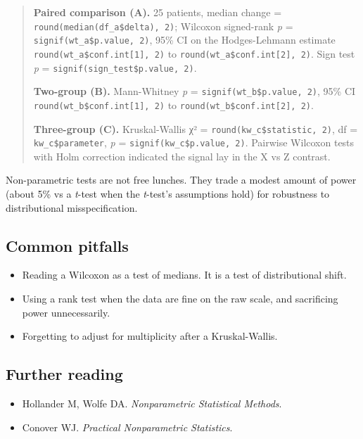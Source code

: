 \documentclass[
]{article}
\providecommand{\tightlist}{%
  \setlength{\itemsep}{0pt}\setlength{\parskip}{0pt}}
\begin{document}
\begin{quote}
\textbf{Paired comparison (A).} 25 patients, median change =
\texttt{round(median(df\_a\$delta),\ 2)}; Wilcoxon signed-rank \emph{p}
= \texttt{signif(wt\_a\$p.value,\ 2)}, 95\% CI on the Hodges-Lehmann
estimate \texttt{round(wt\_a\$conf.int{[}1{]},\ 2)} to
\texttt{round(wt\_a\$conf.int{[}2{]},\ 2)}. Sign test \emph{p} =
\texttt{signif(sign\_test\$p.value,\ 2)}.

\textbf{Two-group (B).} Mann-Whitney \emph{p} =
\texttt{signif(wt\_b\$p.value,\ 2)}, 95\% CI
\texttt{round(wt\_b\$conf.int{[}1{]},\ 2)} to
\texttt{round(wt\_b\$conf.int{[}2{]},\ 2)}.

\textbf{Three-group (C).} Kruskal-Wallis χ² =
\texttt{round(kw\_c\$statistic,\ 2)}, df = \texttt{kw\_c\$parameter},
\emph{p} = \texttt{signif(kw\_c\$p.value,\ 2)}. Pairwise Wilcoxon tests
with Holm correction indicated the signal lay in the X vs Z contrast.
\end{quote}

Non-parametric tests are not free lunches. They trade a modest amount of
power (about 5\% vs a \emph{t}-test when the \emph{t}-test's assumptions
hold) for robustness to distributional misspecification.

\subsection{Common pitfalls}\label{common-pitfalls}

\begin{itemize}
\tightlist
\item
  Reading a Wilcoxon as a test of medians. It is a test of
  distributional shift.
\item
  Using a rank test when the data are fine on the raw scale, and
  sacrificing power unnecessarily.
\item
  Forgetting to adjust for multiplicity after a Kruskal-Wallis.
\end{itemize}

\subsection{Further reading}\label{further-reading}

\begin{itemize}
\tightlist
\item
  Hollander M, Wolfe DA. \emph{Nonparametric Statistical Methods}.
\item
  Conover WJ. \emph{Practical Nonparametric Statistics}.
\end{itemize}
\end{document}
